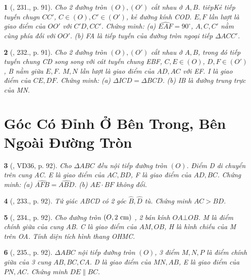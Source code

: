 \documentclass{article}
\newtheorem{baitoan}{}
\begin{document}
\begin{baitoan}[\cite{Binh_Toan_9_tap_2}, 231., p. 91]
	Cho 2 đường tròn $(O),(O')$ cắt nhau ở $A,B$. tiêpKẻ tiếp tuyến chugn $CC'$, $C\in(O),C'\in(O')$, kẻ đường kính COD. $E,F$ lần lượt là giao điểm của $OO'$ với $C'D,CC'$. Chứng minh: (a) $\widehat{EAF} = 90^\circ$, $A,C,C'$ nằm cùng phía đối với $OO'$. (b) FA là tiếp tuyến của đường tròn ngoại tiếp $\Delta ACC'$.
\end{baitoan}

\begin{baitoan}[\cite{Binh_Toan_9_tap_2}, 232., p. 91]
	Cho 2 đường tròn $(O),(O')$ cắt nhau ở $A,B$, trong đó tiếp tuyến chung CD song song với cát tuyến chung EBF, $C,E\in(O)$, $D,F\in(O')$, B nằm giữa $E,F$. $M,N$ lần lượt là giao điểm của $AD,AC$ với EF. I là giao điểm của $CE,DF$. Chứng minh: (a) $\Delta ICD = \Delta BCD$. (b) IB là đường trung trực của MN.
\end{baitoan}


\section{Góc Có Đỉnh Ở Bên Trong, Bên Ngoài Đường Tròn}

\begin{baitoan}[\cite{Binh_Toan_9_tap_2}, VD36, p. 92]
	Cho $\Delta ABC$ đều nội tiếp đường tròn $(O)$. Điểm D di chuyển trên cung AC. E là giao điểm của $AC,BD$, F là giao điểm của $AD,BC$. Chứng minh: (a) $\widehat{AFB} = \widehat{ABD}$. (b) $AE\cdot BF$ không đổi.
\end{baitoan}

\begin{baitoan}[\cite{Binh_Toan_9_tap_2}, 233., p. 92]
	Tứ giác ABCD có 2 góc $\widehat{B},\widehat{D}$ tù. Chứng minh $AC > BD$.
\end{baitoan}

\begin{baitoan}[\cite{Binh_Toan_9_tap_2}, 234., p. 92]
	Cho đường tròn $(O,2\ {\rm cm})$ , 2 bán kính $OA\bot OB$. M là điểm chính giữa của cung AB. C là giao điểm của $AM,OB$, H là hình chiếu của M trên OA. Tính diện tích hình thang OHMC.
\end{baitoan}

\begin{baitoan}[\cite{Binh_Toan_9_tap_2}, 235., p. 92]
	$\Delta ABC$ nội tiếp đường tròn $(O)$, 3 điểm $M,N,P$ là điểm chính giữa của 3 cung $AB,BC,CA$. D là giao điểm của $MN,AB$, E là giao điểm của $PN,AC$. Chứng minh $DE\parallel BC$.
\end{baitoan}
\end{document}
